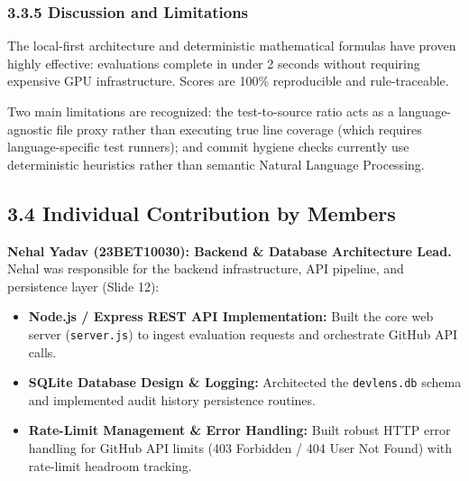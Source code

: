 \documentclass[12pt,a4paper]{article}
\begin{document}
\subsubsection{3.3.5 Discussion and Limitations}
The local-first architecture and deterministic mathematical formulas have proven highly effective: evaluations complete in under 2 seconds without requiring expensive GPU infrastructure. Scores are 100\% reproducible and rule-traceable.

Two main limitations are recognized: the test-to-source ratio acts as a language-agnostic file proxy rather than executing true line coverage (which requires language-specific test runners); and commit hygiene checks currently use deterministic heuristics rather than semantic Natural Language Processing.

\subsection{3.4 Individual Contribution by Members}

\noindent \textbf{Nehal Yadav (23BET10030): Backend \& Database Architecture Lead.} Nehal was responsible for the backend infrastructure, API pipeline, and persistence layer (Slide 12):
\begin{itemize}
    \item \textbf{Node.js / Express REST API Implementation:} Built the core web server (\texttt{server.js}) to ingest evaluation requests and orchestrate GitHub API calls.
    \item \textbf{SQLite Database Design \& Logging:} Architected the \texttt{devlens.db} schema and implemented audit history persistence routines.
    \item \textbf{Rate-Limit Management \& Error Handling:} Built robust HTTP error handling for GitHub API limits (403 Forbidden / 404 User Not Found) with rate-limit headroom tracking.
\end{itemize}
\end{document}

